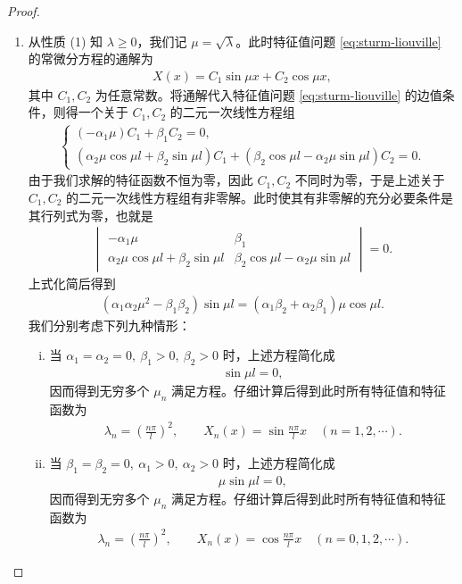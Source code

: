 \documentclass[../../main.tex]{subfiles}%
\begin{document}
\begin{proof}
\begin{enumerate}[(1)]
\item 从性质 (1) 知 $\lambda\geqslant 0$，我们记 $\mu=\sqrt{\lambda}$。此时特征值问题 \eqref{eq:sturm-liouville} 的常微分方程的通解为
\begin{align*}
X(x)=C_1\sin\mu x+C_2\cos\mu x,
\end{align*}
其中 $C_1,C_2$ 为任意常数。将通解代入特征值问题 \eqref{eq:sturm-liouville} 的边值条件，则得一个关于 $C_1,C_2$ 的二元一次线性方程组
\begin{align*}
\begin{cases}
(-\alpha_1\mu)C_1+\beta_1C_2=0, \\
(\alpha_2\mu\cos\mu l+\beta_2\sin\mu l)C_1+(\beta_2\cos\mu l-\alpha_2\mu\sin\mu l)C_2=0.
\end{cases}
\end{align*}
由于我们求解的特征函数不恒为零，因此 $C_1,C_2$ 不同时为零，于是上述关于 $C_1,C_2$ 的二元一次线性方程组有非零解。此时使其有非零解的充分必要条件是其行列式为零，也就是
\begin{align*}
\begin{vmatrix}
-\alpha_1\mu & \beta_1 \\
\alpha_2\mu\cos\mu l+\beta_2\sin\mu l & \beta_2\cos\mu l-\alpha_2\mu\sin\mu l
\end{vmatrix}=0.
\end{align*}
上式化简后得到
\begin{align*}
(\alpha_1\alpha_2\mu^2-\beta_1\beta_2)\sin\mu l=(\alpha_1\beta_2+\alpha_2\beta_1)\mu\cos\mu l.
\end{align*}
我们分别考虑下列九种情形：

\begin{enumerate}[(i)]
\item 当 $\alpha_1=\alpha_2=0,\ \beta_1>0,\ \beta_2>0$ 时，上述方程简化成
\begin{align*}
\sin\mu l=0,
\end{align*}
因而得到无穷多个 $\mu_n$ 满足方程。仔细计算后得到此时所有特征值和特征函数为
\begin{align*}
\lambda_n=\left(\frac{n\pi}{l}\right)^2,\qquad X_n(x)=\sin\frac{n\pi}{l}x\quad (n=1,2,\cdots).
\end{align*}

\item 当 $\beta_1=\beta_2=0,\ \alpha_1>0,\ \alpha_2>0$ 时，上述方程简化成
\begin{align*}
\mu\sin\mu l=0,
\end{align*}
因而得到无穷多个 $\mu_n$ 满足方程。仔细计算后得到此时所有特征值和特征函数为
\begin{align*}
\lambda_n=\left(\frac{n\pi}{l}\right)^2,\qquad X_n(x)=\cos\frac{n\pi}{l}x\quad (n=0,1,2,\cdots).
\end{align*}


\end{enumerate}
\end{enumerate}
\end{proof}
\end{document}
